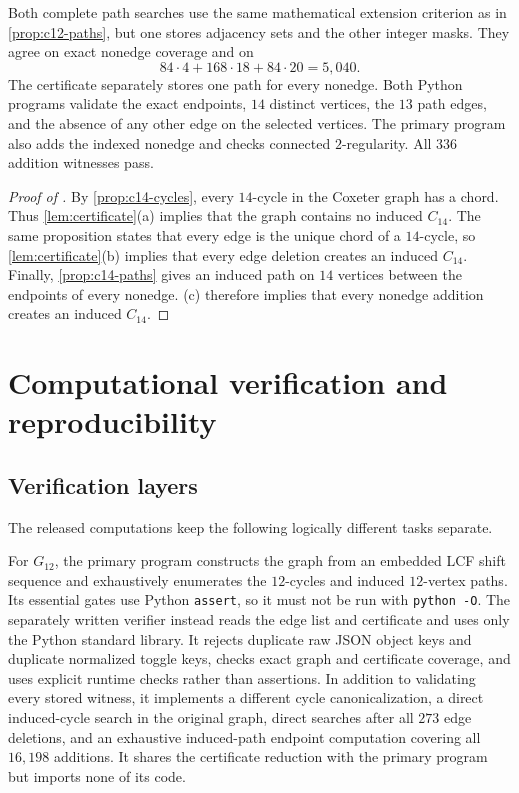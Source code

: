 \documentclass[11pt]{amsart}
\newcommand{\Ck}[1]{C_{#1}}
\newcommand{\Gtwelve}{G_{12}}
\theoremstyle{definition}
\theoremstyle{remark}
\begin{document}
Both complete path searches use the same mathematical extension criterion as
in \cref{prop:c12-paths}, but one stores adjacency sets and the other integer
masks.  They agree on exact nonedge coverage and on
\[
  84\cdot4+168\cdot18+84\cdot20=5{,}040.
\]
The certificate separately stores one path for every nonedge.  Both Python
programs validate the exact endpoints, \(14\) distinct vertices, the
\(13\) path edges, and the absence of any other edge on the selected
vertices.  The primary program also adds the indexed nonedge and checks
connected \(2\)-regularity.  All \(336\) addition witnesses pass.

\begin{proof}[Proof of ]
By \cref{prop:c14-cycles}, every \(14\)-cycle in the Coxeter graph has a
chord.  Thus \cref{lem:certificate}\textup{(a)} implies that the graph
contains no induced \(\Ck{14}\).  The same proposition states that every edge
is the unique chord of a \(14\)-cycle, so
\cref{lem:certificate}\textup{(b)} implies that every edge deletion creates
an induced \(\Ck{14}\).  Finally, \cref{prop:c14-paths} gives an induced path
on \(14\) vertices between the endpoints of every nonedge.
\textup{(c)} therefore implies that every nonedge
addition creates an induced \(\Ck{14}\).
\end{proof}

\section{Computational verification and reproducibility}
\label{sec:repro}

\subsection{Verification layers}

The released computations keep the following logically different tasks
separate.

For \(\Gtwelve\), the primary program constructs the graph from an embedded
LCF shift sequence and exhaustively enumerates the \(12\)-cycles and induced
\(12\)-vertex paths.  Its essential gates use Python \texttt{assert}, so it
must not be run with \texttt{python -O}.  The separately written verifier
instead reads the edge list and certificate and uses only the Python standard
library.  It rejects duplicate raw JSON object keys and duplicate normalized
toggle keys, checks exact graph and certificate coverage, and uses explicit
runtime checks rather than assertions.  In addition to validating every
stored witness, it implements a different cycle canonicalization, a direct
induced-cycle search in the original graph, direct searches after all
\(273\) edge deletions, and an exhaustive induced-path endpoint computation
covering all \(16{,}198\) additions.  It shares the certificate reduction
with the primary program but imports none of its code.
\end{document}
